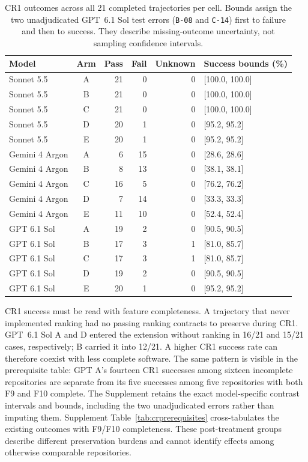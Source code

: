 \begin{table}[!htbp]
\centering\small
\caption{CR1 outcomes across all 21 completed trajectories per cell.
Bounds assign the two unadjudicated GPT~6.1 Sol test errors (\texttt{B-08}
and \texttt{C-14}) first to failure and then to success. They describe
missing-outcome uncertainty, not sampling confidence intervals\@. \armlegend}\label{tab:resultsadaptation}

\begin{tabular*}{\textwidth}{@{\extracolsep{\fill}}lcrrrl@{}}
\toprule
Model & Arm & Pass & Fail & Unknown & Success bounds (\%) \\
\midrule
Sonnet 5.5 & A & 21 & 0 & 0 & [100.0, 100.0] \\
Sonnet 5.5 & B & 21 & 0 & 0 & [100.0, 100.0] \\
Sonnet 5.5 & C & 21 & 0 & 0 & [100.0, 100.0] \\
Sonnet 5.5 & D & 20 & 1 & 0 & [95.2, 95.2] \\
Sonnet 5.5 & E & 20 & 1 & 0 & [95.2, 95.2] \\
\midrule
Gemini 4 Argon & A & 6 & 15 & 0 & [28.6, 28.6] \\
Gemini 4 Argon & B & 8 & 13 & 0 & [38.1, 38.1] \\
Gemini 4 Argon & C & 16 & 5 & 0 & [76.2, 76.2] \\
Gemini 4 Argon & D & 7 & 14 & 0 & [33.3, 33.3] \\
Gemini 4 Argon & E & 11 & 10 & 0 & [52.4, 52.4] \\
\midrule
GPT 6.1 Sol & A & 19 & 2 & 0 & [90.5, 90.5] \\
GPT 6.1 Sol & B & 17 & 3 & 1 & [81.0, 85.7] \\
GPT 6.1 Sol & C & 17 & 3 & 1 & [81.0, 85.7] \\
GPT 6.1 Sol & D & 19 & 2 & 0 & [90.5, 90.5] \\
GPT 6.1 Sol & E & 20 & 1 & 0 & [95.2, 95.2] \\
\bottomrule
\end{tabular*}
\end{table}

CR1 success must be read with feature completeness. A trajectory that never
implemented ranking had no passing ranking contracts to preserve during
CR1. GPT~6.1 Sol A and D entered the extension without ranking in 16/21
and 15/21 cases, respectively; B carried it into 12/21. A higher CR1
success rate can therefore coexist with less complete software. The
same pattern is visible in the prerequisite table: GPT A's fourteen CR1
successes among sixteen incomplete repositories are separate from its
five successes among five repositories with both F9 and F10 complete.
The
Supplement retains the exact model-specific contrast intervals and bounds,
including the two unadjudicated errors rather than imputing them.
Supplement Table~\ref{tab:crprerequisites} cross-tabulates the existing
outcomes with F9/F10 completeness. These post-treatment groups describe
different preservation burdens and cannot identify effects among otherwise
comparable repositories.

